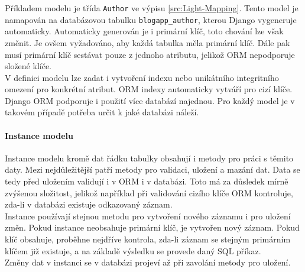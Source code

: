 \documentclass[ing,male,java,dept456]{diploma}						%
\begin{document}
Příkladem modelu je třída \lstinline[style=inlinepython]|Author| ve výpisu \ref{src:Light-Mapping}. Tento model je namapován na databázovou tabulku \lstinline[style=inlinepython]|blogapp_author|, kterou Django vygeneruje automaticky. Automaticky generován je i primární klíč, toto chování lze však změnit. Je ovšem vyžadováno, aby každá tabulka měla primární klíč. Dále pak musí primární klíč sestávat pouze z jednoho atributu, jelikož ORM nepodporuje složené klíče. \\
V definici modelu lze zadat i vytvoření indexu nebo unikátního integritního omezení pro konkrétní atribut. ORM indexy automaticky vytváří pro cizí klíče. \\
Django ORM podporuje i použití více databází najednou. Pro každý model je v takovém případě potřeba určit k jaké databázi náleží. \\

\paragraph{Instance modelu}

Instance modelu kromě dat řádku tabulky obsahují i metody pro práci s těmito daty. Mezi nejdůležitější patří metody pro validaci, uložení a mazání dat. Data se tedy před uložením validují i v ORM i v databázi. Toto má za důsledek mírně zvýšenou složitost, jelikož například při validování cizího klíče ORM kontroluje, zda-li v databázi existuje odkazovaný záznam. \\
Instance používají stejnou metodu pro vytvoření nového záznamu i pro uložení změn. Pokud instance neobsahuje primární klíč, je vytvořen nový záznam. Pokud klíč obsahuje, proběhne nejdříve kontrola, zda-li záznam se stejným primárním klíčem již existuje, a na základě výsledku se provede daný SQL příkaz. \\
Změny dat v instanci se v databázi projeví až při zavolání metody pro uložení. 
\end{document}
